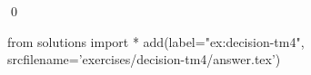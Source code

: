 
\begin{ex} 
  \label{ex:decision-tm4}
  
  \qed
\end{ex} 
\begin{python0}
from solutions import *
add(label="ex:decision-tm4",
    srcfilename='exercises/decision-tm4/answer.tex') 
\end{python0}
